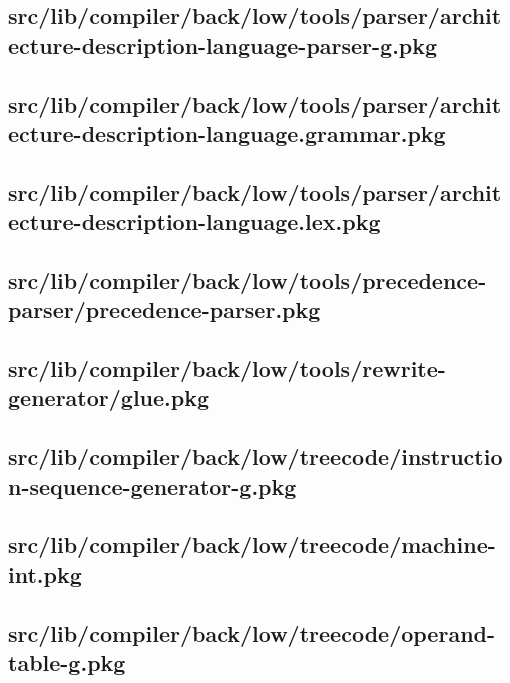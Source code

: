 \subsection{src/lib/compiler/back/low/tools/parser/architecture-description-language-parser-g.pkg}


\subsection{src/lib/compiler/back/low/tools/parser/architecture-description-language.grammar.pkg}


\subsection{src/lib/compiler/back/low/tools/parser/architecture-description-language.lex.pkg}


\subsection{src/lib/compiler/back/low/tools/precedence-parser/precedence-parser.pkg}


\subsection{src/lib/compiler/back/low/tools/rewrite-generator/glue.pkg}


\subsection{src/lib/compiler/back/low/treecode/instruction-sequence-generator-g.pkg}


\subsection{src/lib/compiler/back/low/treecode/machine-int.pkg}


\subsection{src/lib/compiler/back/low/treecode/operand-table-g.pkg}


